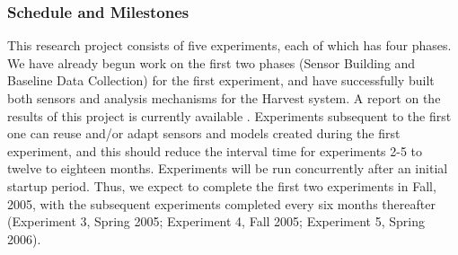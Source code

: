 \subsubsection{Schedule and Milestones}

This research project consists of five experiments, each of which has four
phases. We have already begun work on the first two phases (Sensor Building and
Baseline Data Collection) for the
first experiment, and have successfully built both sensors and analysis
mechanisms for the Harvest system. A report on the results of this project
is currently available \cite{csdl2-03-07}.  Experiments subsequent to the
first one can reuse and/or adapt sensors and models created during the
first experiment, and this should reduce the interval time for experiments
2-5 to twelve to eighteen months. Experiments will be run concurrently
after an initial startup period.  Thus, we expect to complete the first two
experiments in Fall, 2005, with the subsequent experiments completed every
six months thereafter (Experiment 3, Spring 2005; Experiment 4, Fall 2005;
Experiment 5, Spring 2006).



